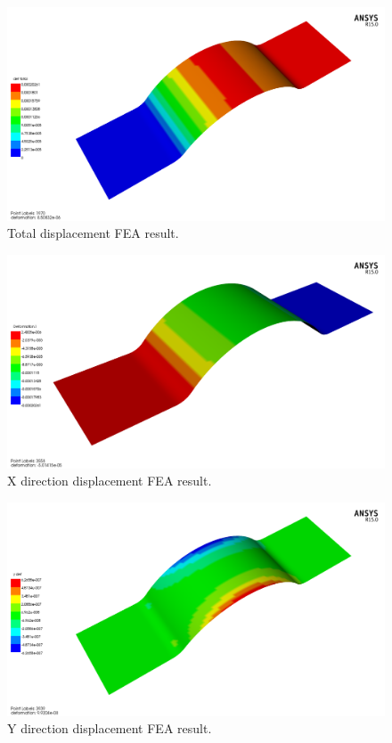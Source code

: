 \begin{figure}[htp]
\centering
\includegraphics[width=1\textwidth]{./figures/fea/fea-acp-tot-def}
\caption{Total displacement FEA result.}
\label{fig:fea-acp-tot-def}
\end{figure}

\begin{figure}[htp]
\centering
\includegraphics[width=1\textwidth]{./figures/fea/fea-acp-x-def}
\caption{X direction displacement FEA result.}
\label{fig:fea-acp-x-def}
\end{figure}

\begin{figure}[htp]
\centering
\includegraphics[width=1\textwidth]{./figures/fea/fea-acp-y-def}
\caption{Y direction displacement FEA result.}
\label{fig:fea-acp-y-def}
\end{figure}

